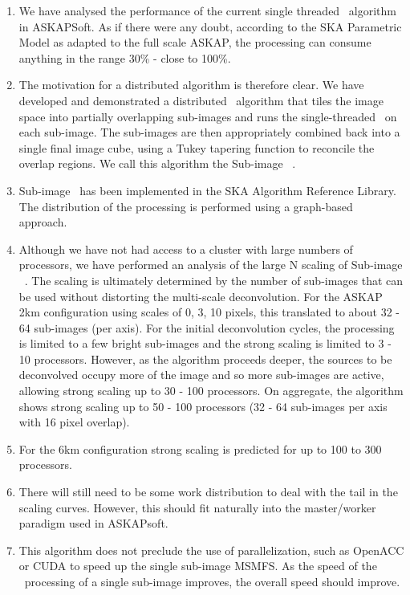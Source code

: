 \documentclass[11pt,a4paper,variablewidth]{article}
\begin{document}
\begin{enumerate}
	\item We have analysed the performance of the current single threaded \MAM\ algorithm in ASKAPSoft. As if there were any doubt, according to the SKA Parametric Model as adapted to the full scale ASKAP, the processing can consume anything in the range 30\% - close to 100\%.
	\item The motivation for a distributed algorithm is therefore clear. We have developed and demonstrated a distributed \MAM\ algorithm that tiles the image space into partially overlapping sub-images and runs the single-threaded \MAM\ on each sub-image. The sub-images are then appropriately combined back into a single final image cube, using a Tukey tapering function to reconcile the overlap regions. We call this algorithm the Sub-image \MAM\ .
	\item Sub-image \MAM\ has been implemented in the SKA Algorithm Reference Library. The distribution of the processing is performed using a graph-based approach.
	\item Although we have not had access to a cluster with large numbers of processors, we have performed an analysis of the large N scaling of Sub-image \MAM\ . The scaling is ultimately determined by the number of sub-images that can be used without distorting the multi-scale deconvolution. For the ASKAP 2km configuration using scales of 0, 3, 10 pixels, this translated to about 32 - 64 sub-images (per axis). For the initial deconvolution cycles, the processing is limited to a few bright sub-images and the strong scaling is limited to 3 - 10 processors. However, as the algorithm proceeds deeper, the sources to be deconvolved occupy more of the image and so more sub-images are active, allowing strong scaling up to 30 - 100 processors. On aggregate, the algorithm shows strong scaling up to 50 - 100 processors (32 - 64 sub-images per axis with 16 pixel overlap).
	\item For the 6km configuration strong scaling is predicted for up to 100 to 300 processors.
	\item There will still need to be some work distribution to deal with the tail in the scaling curves. However, this should fit naturally into the master/worker paradigm used in ASKAPsoft.
	\item This algorithm does not preclude the use of parallelization, such as OpenACC or CUDA to speed up the single sub-image MSMFS. As the speed of the \MAM\ processing of a single sub-image improves, the overall speed should improve.

\end{enumerate}
\end{document}
